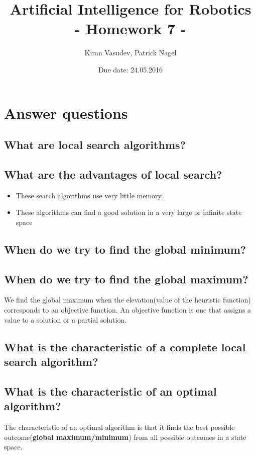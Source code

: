 \documentclass[11pt]{article}
\title{\textbf{Artificial Intelligence for Robotics\\ - Homework 7 -}}
\author{Kiran Vasudev, Patrick Nagel}
\date{Due date: 24.05.2016}
\begin{document}
\maketitle

\newpage
\tableofcontents

\newpage
\section{Answer questions}
\subsection{What are local search algorithms?}

\subsection{What are the advantages of local search?}
\begin{itemize}
\item {These search algorithms use very little memory.}
\item {These algorithms can find a good solution in a very large or infinite state space}
\end{itemize}

\subsection{When do we try to find the global minimum?}

\subsection{When do we try to find the global maximum?}
We find the global maximum when the elevation(value of the heuristic function) corresponds to an objective function. An objective function is one that assigns a value to a solution or a partial solution.

\subsection{What is the characteristic of a complete local search algorithm?}

\subsection{What is the characteristic of an optimal algorithm?}
The characteristic of an optimal algorithm is that it finds the best possible outcome(\textbf{global maximum/minimum}) from all possible outcomes in a state space.
\end{document}

